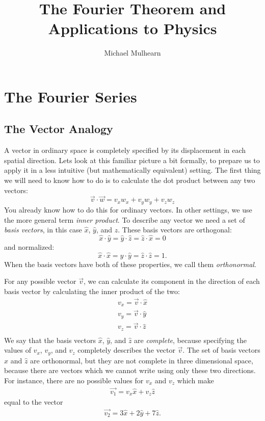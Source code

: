 \documentclass[12pt,oneside]{book}
\begin{document}
\title{The Fourier Theorem and Applications to Physics}
\author{Michael Mulhearn}

\maketitle

\chapter{The Fourier Series}
\section{The Vector Analogy}

A vector in ordinary space is completely specified by its displacement in each spatial direction.  Lets look at this familiar picture a bit formally, to prepare us to apply it in a less intuitive (but mathematically equivalent) setting.  The first thing we will need to know how to do is to calculate the dot product between any two vectors:  
\begin{displaymath}
\vec{v} \cdot \vec{w} = v_x w_x + v_y w_y + v_z w_z 
\end{displaymath}
You already know how to do this for ordinary vectors.  In other settings, we use the more general term {\em inner product}.  To describe any vector we need a set of {\em basis vectors}, in this case $\hat{x}$, $\hat{y}$, and $\hat{z}$.  These basis vectors are orthogonal:
\begin{displaymath}
\hat{x} \cdot \hat{y} = \hat{y} \cdot \hat{z} = \hat{z} \cdot \hat{x} = 0
\end{displaymath}
and normalized:
\begin{displaymath}
\hat{x} \cdot \hat{x} = \hat{y} \cdot \hat{y} = \hat{z} \cdot \hat{z} = 1.
\end{displaymath}
When the basis vectors have both of these properties, we call them {\em orthonormal}.

For any possible vector $\vec{v}$, we can calculate its component in the direction of each basis vector by calculating the inner product of the two:
\begin{eqnarray*}
v_x = \vec{v} \cdot \hat{x} \\
v_y = \vec{v} \cdot \hat{y} \\
v_z = \vec{v} \cdot \hat{z} \\
\end{eqnarray*}
We say that the basis vectors $\hat{x}$, $\hat{y}$, and $\hat{z}$ are {\em complete}, because specifying the values of $v_x$, $v_y$, and $v_z$ completely describes the vector $\vec{v}$.  The set of basis vectors $\hat{x}$ and $\hat{z}$ are orthonormal, but they are not complete in three dimensional space, because there are vectors which we cannot write using only these two directions.  For instance, there are no possible values for $v_x$ and $v_z$
which make
\begin{eqnarray*}
 \vec{v_1} = v_x \hat{x} + v_z \hat{z}
\end{eqnarray*}
equal to the vector
\begin{eqnarray*}
 \vec{v_2} = 3 \hat{x} + 2 \hat{y} + 7 \hat{z}.
\end{eqnarray*}
\end{document}
